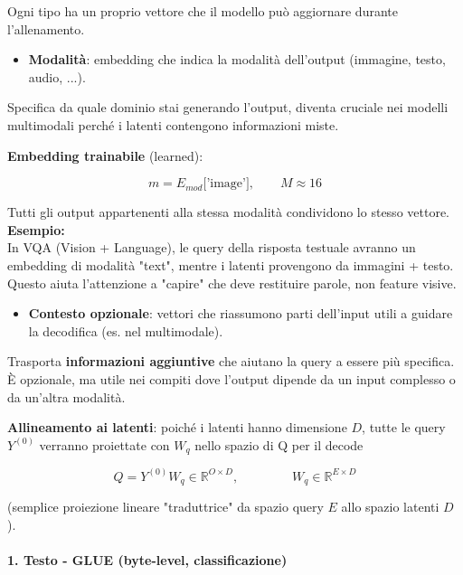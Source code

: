 \documentclass[
  11pt,
]{article}
\begin{document}
Ogni tipo ha un proprio vettore che il modello può aggiornare durante
l'allenamento.


\begin{itemize}
\item
  \textbf{Modalità}: embedding che indica la modalità
  dell'output (immagine, testo, audio, ...).
\end{itemize}

Specifica da quale dominio stai generando l'output, diventa cruciale nei
modelli multimodali perché i latenti contengono informazioni miste.

\textbf{Embedding trainabile} (learned):

\[m = E_{mod}\lbrack\text{'image'}\rbrack,\ \ \ \ \ \ \ \ \ M \approx 16\]

Tutti gli output appartenenti alla stessa modalità condividono lo stesso
vettore.\\
\textbf{Esempio:}\\
In VQA (Vision + Language), le query della risposta testuale avranno un
embedding di modalità "text", mentre i latenti provengono da immagini +
testo.\\
Questo aiuta l'attenzione a "capire" che deve restituire
parole, non feature visive.

\begin{itemize}
\item
  \textbf{Contesto opzionale}: vettori che riassumono parti
  dell'input utili a guidare la decodifica (es. nel
  multimodale).
\end{itemize}


Trasporta \textbf{informazioni aggiuntive} che aiutano la query a essere
più specifica.\\
È opzionale, ma utile nei compiti dove l'output dipende da un input
complesso o da un'altra modalità.


\textbf{Allineamento ai latenti}: poiché i latenti hanno dimensione
\(D\), tutte le query \(Y^{(0)}\) verranno proiettate con \(W_{q}\)
nello spazio di Q per il decode

\[Q = Y^{(0)}W_{q} \in \mathbb{R}^{O \times D},\ {\ \ \ \ \ \ \ \ \ \ \ \ \ \ \ \ \ \ W}_{q} \in \mathbb{R}^{E \times D}\]

(semplice proiezione lineare "traduttrice" da spazio query \(E\) allo
spazio latenti \(D\) ).

\paragraph{1. \textbf{Testo - GLUE (byte-level, classificazione)}}
\end{document}
